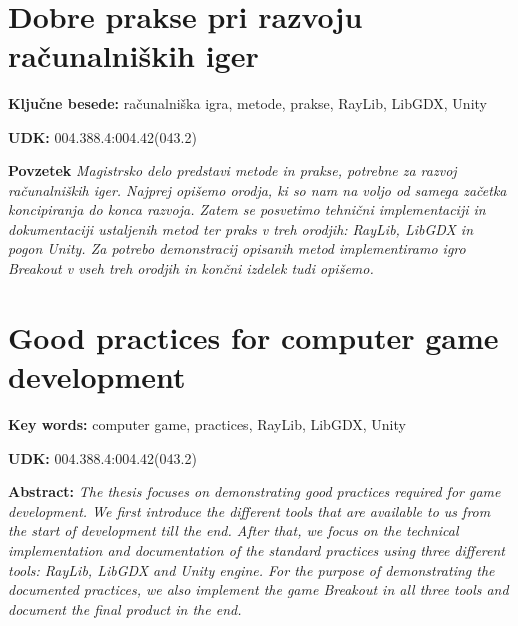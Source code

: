 \documentclass[12pt,a4paper,twoside]{book}
\begin{document}
\ \thispagestyle{empty}
\newpage
\ \thispagestyle{empty}
\chapter*{Dobre prakse pri razvoju računalniških iger}\thispagestyle{fancy}
\setcounter{page}{1}
\textbf{Ključne besede:} računalniška igra, metode, prakse, RayLib, LibGDX, Unity

\textbf{UDK:} 004.388.4:004.42(043.2)

\textbf{Povzetek}\newline
\textit{Magistrsko delo predstavi metode in prakse, potrebne za razvoj računalniških iger. Najprej opišemo orodja, ki so nam na voljo od samega začetka koncipiranja do konca razvoja. Zatem se posvetimo tehnični implementaciji in dokumentaciji ustaljenih metod ter praks v treh orodjih: RayLib, LibGDX in pogon Unity. Za potrebo demonstracij opisanih metod implementiramo igro Breakout v vseh treh orodjih in končni izdelek tudi opišemo.}
\cleardoublepage

\chapter*{Good practices for computer game development}\thispagestyle{fancy}
\textbf{Key words:} computer game, practices, RayLib, LibGDX, Unity

\textbf{UDK:} 004.388.4:004.42(043.2)

\textbf{Abstract:}\newline
\textit{The thesis focuses on demonstrating good practices required for game development. We first introduce the different tools that are available to us from the start of development till the end. After that, we focus on the technical implementation and documentation of the standard practices using three different tools: RayLib, LibGDX and Unity engine. For the purpose of demonstrating the documented practices, we also implement the game Breakout in all three tools and document the final product in the end.}
\cleardoublepage

\tableofcontents

\listoffigures

\lstlistoflistings

\end{document}
